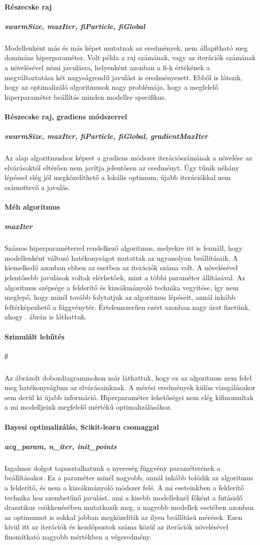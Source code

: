 \paragraph{Részecske raj}\subparagraph{swarmSize, maxIter, fiParticle, fiGlobal} Modellenként más és más képet mutatnak az eredmények, nem állapítható meg domináns hiperparaméter. Volt példa a raj számának, vagy az iterációk számának a növelésével némi javulásra, helyenként azonban a fi-k értékének a megváltoztatása két nagyságrendű javulást is eredményezett. Ebből is látszik, hogy az optimalizáló algoritmusok nagy problémája, hogy a megfelelő hiperparaméter beállítás minden modellre specifikus.
\paragraph{Részecske raj, gradiens módszerrel}\subparagraph{swarmSize, maxIter, fiParticle, fiGlobal, gradientMaxIter} Az alap algoritmushoz képest a gradiens módszer iterációszámának a növelése az elvárásoktól eltérően nem javítja jelentősen az eredményt. Úgy tűnik néhány lépéssel elég jól megközelíthető a lokális optimum, újabb iterációkkal nem számottevő a javulás. 
\paragraph{Méh algoritmus}\subparagraph{maxIter} Számos hiperparaméterrel rendelkező algoritmus, melyekre itt is fennáll, hogy modellenként változó hatékonyságot mutattak az ugyanolyan beállításaik. A kiemelkedő azonban ebben az esetben az iterációk száma volt. A növelésével jelentősebb javulások voltak elérhetőek, mint a többi paraméter állításával. Az algoritmus szépsége a felderítő és kizsákmányoló technika vegyítése, így nem meglepő, hogy minél tovább folytatjuk az algoritmus lépéseit, annál inkább feltérképezhető a függvénytér. Értelemszerűen ezért azonban nagy árat fizetünk, ahogy . ábrán is láthattuk.
\paragraph{Szimulált lehűtés}\subparagraph{$\emptyset$} Az  ábrázolt dobozdiagrammokon már láthattuk, hogy ez az algoritmus nem felel meg hatékonyságban az elvárásainknak. A mérési eredmények külön vizsgálásakor sem derül ki újabb információ. Hiperparaméter lehetőségei nem elég kifinomultak a mi modelljeink megfelelő mértékű optimalizálásához.
\paragraph{Bayesi optimalizálás, Scikit-learn csomaggal}\subparagraph{acq\_param, n\_iter, init\_points} Izgalmas dolgot tapasztalhatunk a nyereség függvény paraméterének a beállításakor. Ez a paraméter minél nagyobb, annál inkább tolódik az algoritmus a felderítő, és nem a kizsákmányoló módszer felé. A mi eseteinkben a felderítő technika hoz szembetűnő javulást, ami a kisebb modelleknél főként a futásidő drasztikus csökkenésében mutatkozik meg, a nagyobb modellek esetében azonban az optimumot is sokkal jobban megközelítik az ilyen beállítású mérések. Ezen kívül itt az iterációk és kezdőpontok száma közül az iterációk növelésével finomítható nagyobb mértékben a végeredmény.
